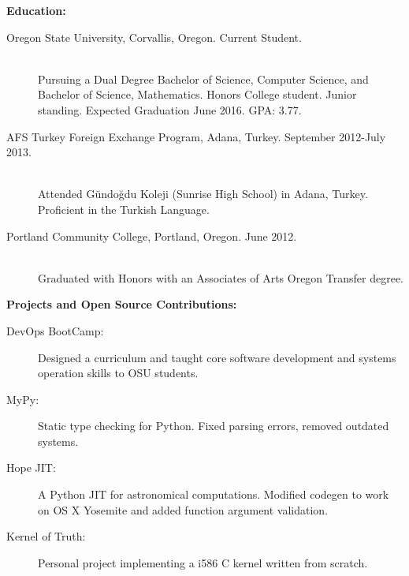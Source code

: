 \documentclass[11pt]{article}
\begin{document}
\bigskip

{\Large \bf Education:}
\begin{description}
	\item[Oregon State University, Corvallis, Oregon.
		\hfill Current Student.]
		\hfill \\
		Pursuing a Dual Degree Bachelor of Science, Computer Science,
		and Bachelor of Science, Mathematics.
		Honors College student. Junior standing. Expected Graduation June 2016.
		GPA: 3.77.
		
	\item[AFS Turkey Foreign Exchange Program, Adana, Turkey.
		\hfill September 2012-July 2013.]
		\hfill \\
		Attended G{\" u}ndo{\u g}du Koleji (Sunrise High School) in Adana, 
		Turkey. Proficient in the Turkish Language.

	\item[Portland Community College, Portland, Oregon.
		\hfill June 2012.]
		\hfill \\
		Graduated with Honors with an Associates of Arts 
		Oregon Transfer degree.

\end{description}

\bigskip

{\Large \bf Projects and Open Source Contributions:}
\begin{description}
\item[DevOps BootCamp:] Designed a curriculum and taught core
software development and systems operation skills to OSU students.
\item[MyPy:] Static type checking for Python. Fixed parsing errors,
	removed outdated systems.
\item[Hope JIT:] A Python JIT for astronomical computations. Modified codegen
to work on OS X Yosemite and added function argument validation.
\item[Kernel of Truth:] Personal project implementing a i586 C kernel written
	from scratch.
\end{description}
\end{document}

